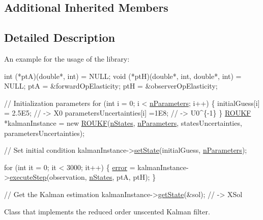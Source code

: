 \subsection*{Additional Inherited Members}


\subsection{Detailed Description}
An example for the usage of the library\+:


\begin{DoxyCode}
   int (*ptA)(\textcolor{keywordtype}{double}*, int) = NULL;
void (*ptH)(\textcolor{keywordtype}{double}*, int, \textcolor{keywordtype}{double}*, int) = NULL;
ptA = \&forwardOpElasticity;
ptH = \&observerOpElasticity;

 \textcolor{comment}{//    Initialization parameters}
\textcolor{keywordflow}{for} (\textcolor{keywordtype}{int} i = 0; i < \mbox{\hyperlink{classAbstractROUKF_a488f708dcdd66758cd879421cd454846}{nParameters}}; i++) \{
   initialGuess[i] = 2.5E5;            \textcolor{comment}{// -> X0}
   parametersUncertainties[i] =1E8;    \textcolor{comment}{// -> U0^\{-1\}}
\}
\mbox{\hyperlink{classROUKF}{ROUKF}} *kalmanInstance = \textcolor{keyword}{new} \mbox{\hyperlink{classROUKF}{ROUKF}}(\mbox{\hyperlink{classAbstractROUKF_af9ce480feb5d97761f20fdd546878aff}{nStates}}, \mbox{\hyperlink{classAbstractROUKF_a488f708dcdd66758cd879421cd454846}{nParameters}}, statesUncertainties,
parametersUncertainties);

\textcolor{comment}{// Set initial condition}
kalmanInstance->\mbox{\hyperlink{classAbstractROUKF_a618f4719892c0997e5f62cc23913aa12}{setState}}(initialGuess, \mbox{\hyperlink{classAbstractROUKF_a488f708dcdd66758cd879421cd454846}{nParameters}});

\textcolor{keywordflow}{for} (\textcolor{keywordtype}{int} it = 0; it < 3000; it++) \{
   \mbox{\hyperlink{classAbstractROUKF_a551d0b61b010efe7923358c93cbd0db5}{error}} = kalmanInstance->\mbox{\hyperlink{classROUKF_ad200c0176a1e6e443fbea55bd8905dd6}{executeStep}}(observation, \mbox{\hyperlink{classAbstractROUKF_af9ce480feb5d97761f20fdd546878aff}{nStates}}, ptA, ptH);
\}

\textcolor{comment}{// Get the Kalman estimation}
kalmanInstance->\mbox{\hyperlink{classAbstractROUKF_ad24dafa1f4cb02a38958264740588b87}{getState}}(\&sol);            \textcolor{comment}{// -> XSol}
\end{DoxyCode}
 Class that implements the reduced order unscented Kalman filter. 

